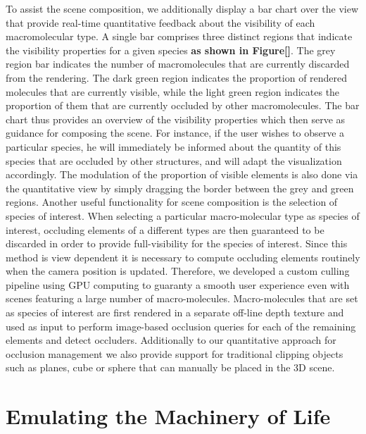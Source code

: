 To assist the scene composition, we additionally display a bar chart over the view that provide real-time quantitative feedback about the visibility of each macromolecular type.
A single bar comprises three distinct regions that indicate the visibility properties for a given species \textbf{as shown in Figure[]}.
The grey region bar indicates the number of macromolecules that are currently discarded from the rendering.
The dark green region indicates the proportion of rendered molecules that are currently visible, while the light green region indicates the proportion of them that are currently occluded by other macromolecules.
The bar chart thus provides an overview of the visibility properties which then serve as guidance for composing the scene.
For instance, if the user wishes to observe a particular species, he will immediately be informed about the quantity of this species that are occluded by other structures, and will adapt the visualization accordingly.
The modulation of the proportion of visible elements is also done via the quantitative view by simply dragging the border between the grey and green regions. 
Another useful functionality for scene composition is the selection of species of interest.
When selecting a particular macro-molecular type as species of interest, occluding elements of a different types are then guaranteed to be discarded in order to provide full-visibility for the species of interest.
Since this method is view dependent it is necessary to compute occluding elements routinely when the camera position is updated.
Therefore, we developed a custom culling pipeline using GPU computing to guaranty a smooth user experience even with scenes featuring a large number of macro-molecules.
Macro-molecules that are set as species of interest are first rendered in a separate off-line depth texture and used as input to perform image-based occlusion queries for each of the remaining elements and detect occluders.
Additionally to our quantitative approach for occlusion management we also provide support for traditional clipping objects such as planes, cube or sphere that can manually be placed in the 3D scene.

\section{Emulating the Machinery of Life}

